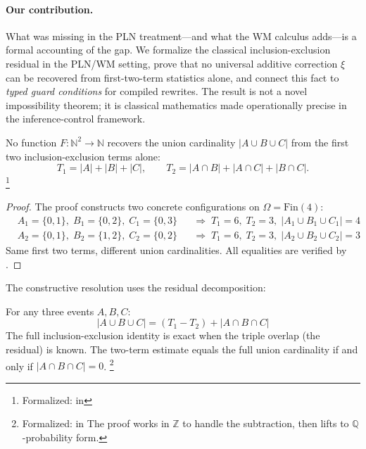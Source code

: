 \documentclass[11pt,openany]{report}
\begin{document}
\paragraph{Our contribution.}
What was missing in the PLN treatment---and what the WM calculus
adds---is a formal accounting of the gap.  We formalize the classical
inclusion-exclusion residual in the PLN/WM setting, prove that no
universal additive correction $\xi$ can be recovered from
first-two-term statistics alone, and connect this fact to
\emph{typed guard conditions} for compiled rewrites.  The result is
not a novel impossibility theorem; it is classical mathematics made
operationally precise in the inference-control framework.

\begin{theorem}
\label{thm:ie-no-go}
No function $F : \mathbb{N}^2 \to \mathbb{N}$ recovers the union
cardinality $|A \cup B \cup C|$ from the first two
inclusion-exclusion terms alone:
\[
  T_1 = |A| + |B| + |C|, \qquad
  T_2 = |A \cap B| + |A \cap C| + |B \cap C|.
\]%
\footnote{Formalized:
in 
}
\end{theorem}

\begin{proof}[Proof]
The proof constructs two concrete configurations on
$\Omega = \mathrm{Fin}(4)$:
\begin{align*}
  &A_1 = \{0,1\},\; B_1 = \{0,2\},\; C_1 = \{0,3\}
    &&\Longrightarrow\; T_1 = 6,\; T_2 = 3,\; |A_1 \cup B_1 \cup C_1| = 4 \\
  &A_2 = \{0,1\},\; B_2 = \{1,2\},\; C_2 = \{0,2\}
    &&\Longrightarrow\; T_1 = 6,\; T_2 = 3,\; |A_2 \cup B_2 \cup C_2| = 3
\end{align*}
Same first two terms, different union cardinalities.  All equalities
are verified by .
\end{proof}

\noindent
The constructive resolution uses the residual decomposition:

\begin{theorem}
\label{thm:residual-decomp}
For any three events $A, B, C$:
\[
  |A \cup B \cup C| = (T_1 - T_2) + |A \cap B \cap C|
\]
The full inclusion-exclusion identity is exact when the triple
overlap (the residual) is known.  The two-term estimate equals
the full union cardinality if and only if $|A \cap B \cap C| = 0$.%
\footnote{Formalized:
in 
  The proof works in $\mathbb{Z}$ to handle the
subtraction, then lifts to $\mathbb{Q}$-probability form.}
\end{theorem}
\end{document}
